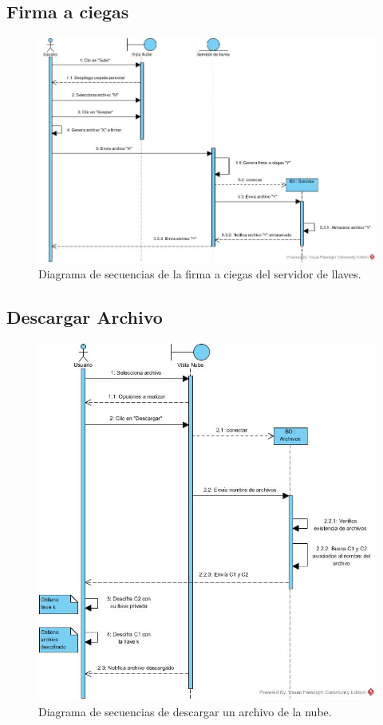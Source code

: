 \subsection{Firma a ciegas}

\begin{figure}[htbp!]
\centering
\includegraphics[width=1\textwidth]{images/Firma_ciegas}
\caption{Diagrama de secuencias de la firma a ciegas del servidor de llaves.}
\end{figure} 
\newpage

\subsection{Descargar Archivo}

\begin{figure}[htbp!]
\centering
\includegraphics[width=1\textwidth]{images/Descargar_Archivo}
\caption{Diagrama de secuencias de descargar un archivo de la nube.}
\end{figure}

